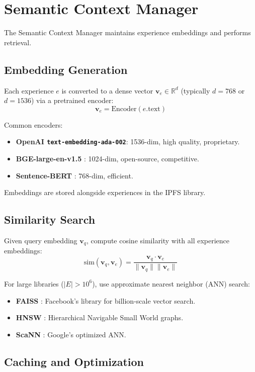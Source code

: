 \section{Semantic Context Manager}


The Semantic Context Manager maintains experience embeddings and performs retrieval.

\subsection{Embedding Generation}

Each experience $e$ is converted to a dense vector $\mathbf{v}_e \in \mathbb{R}^d$ (typically $d = 768$ or $d = 1536$) via a pretrained encoder:
\[
\mathbf{v}_e = \text{Encoder}(e.\text{text})
\]

Common encoders:
\begin{itemize}
\item \textbf{OpenAI \texttt{text-embedding-ada-002}}: 1536-dim, high quality, proprietary.
\item \textbf{BGE-large-en-v1.5} \cite{xiao2023bge}: 1024-dim, open-source, competitive.
\item \textbf{Sentence-BERT} \cite{reimers2019sentencebert}: 768-dim, efficient.
\end{itemize}

Embeddings are stored alongside experiences in the IPFS library.

\subsection{Similarity Search}

Given query embedding $\mathbf{v}_q$, compute cosine similarity with all experience embeddings:
\[
\text{sim}(\mathbf{v}_q, \mathbf{v}_e) = \frac{\mathbf{v}_q \cdot \mathbf{v}_e}{\|\mathbf{v}_q\| \|\mathbf{v}_e\|}
\]

For large libraries ($|E| > 10^6$), use approximate nearest neighbor (ANN) search:
\begin{itemize}
\item \textbf{FAISS} \cite{johnson2019faiss}: Facebook's library for billion-scale vector search.
\item \textbf{HNSW} \cite{malkov2018hnsw}: Hierarchical Navigable Small World graphs.
\item \textbf{ScaNN} \cite{guo2020scann}: Google's optimized ANN.
\end{itemize}

\subsection{Caching and Optimization}

